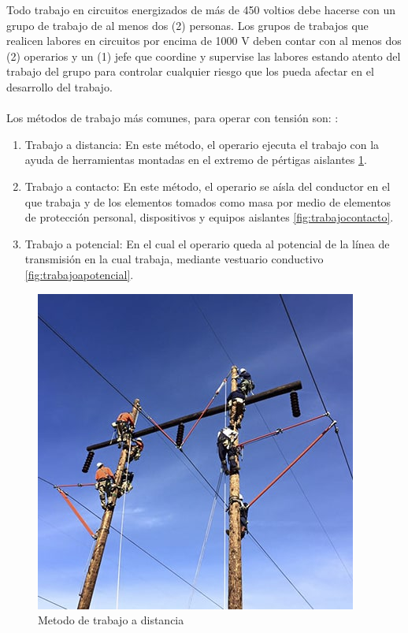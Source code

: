 \documentclass[a5paper]{book}%
\begin{document}
Todo trabajo en circuitos energizados de más de 450 voltios debe hacerse con un grupo de trabajo de al menos dos (2) personas. Los grupos de trabajos que realicen labores en circuitos por encima de 1000 V deben contar con al menos dos (2) operarios y un (1) jefe que coordine y supervise las labores estando atento del trabajo del grupo para controlar cualquier riesgo que los pueda afectar en
el desarrollo del trabajo.  \cite{RETIE2013}\\\\

Los métodos de trabajo más comunes, para operar con tensión son: \cite{RETIE2013}:

\begin{enumerate}
	\item Trabajo a distancia: En este método, el operario ejecuta
          el trabajo con la ayuda de herramientas montadas en el
          extremo de pértigas aislantes \ref{fig:trabajoadistancia}.
	\item Trabajo a contacto: En este método, el operario se aísla
          del conductor en el que trabaja y de los elementos tomados
          como masa por medio de elementos de protección personal,
          dispositivos y equipos aislantes \ref{fig:trabajocontacto}.
	\item Trabajo a potencial: En el cual el operario queda al
          potencial de la línea de transmisión en la cual trabaja,
          mediante vestuario conductivo \ref{fig:trabajoapotencial}.
        \end{enumerate}

        \begin{figure}[H]
          \centering
          \caption{Metodo de trabajo a distancia}
          \label{fig:trabajoadistancia}
          \includegraphics[width=\linewidth]{trabajo_distancia}
        \end{figure}
\end{document}
